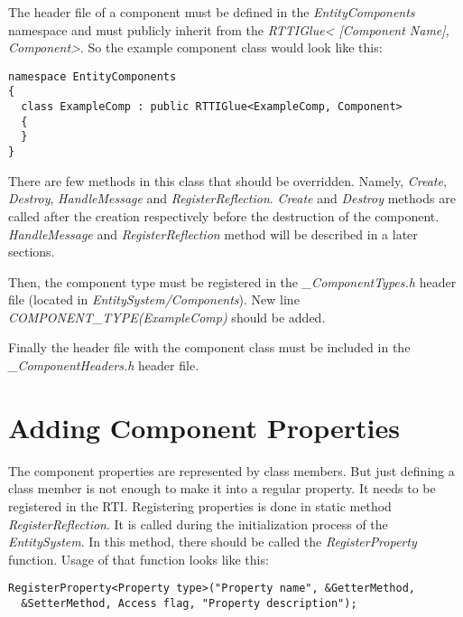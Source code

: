 \documentclass[a4paper, 12pt]{report}
\begin{document}
The header file of a component must be defined in the \emph{EntityComponents} namespace and must publicly inherit from the  \emph{RTTIGlue< [Component Name], Component>}. So the example component class would look like this:

\begin{verbatim}
namespace EntityComponents
{
  class ExampleComp : public RTTIGlue<ExampleComp, Component>
  {
  }
}
\end{verbatim}

There are few methods in this class that should be overridden. Namely, \emph{Create}, \emph{Destroy}, \emph{HandleMessage} and \emph{RegisterReflection}. \emph{Create} and \emph{Destroy} methods are called after the creation respectively before the destruction of the component. \emph{HandleMessage} and \emph{RegisterReflection} method will be described in a later sections.

Then, the component type must be registered in the \emph{\_ComponentTypes.h} header file (located in \emph{EntitySystem/Components}). New line \emph{COMPONENT\_TYPE(ExampleComp)} should be added.

Finally the header file with the component class must be included in the \emph{\_ComponentHeaders.h} header file.

\section{Adding Component Properties}

The component properties are represented by class members. But just defining a class member is not enough to make it into a regular property. It needs to be registered in the RTI. Registering properties is done in static method \emph{RegisterReflection}. It is called during the initialization process of the \emph{EntitySystem}. In this method, there should be called the \emph{RegisterProperty} function. Usage of that function looks like this:

\begin{verbatim}
RegisterProperty<Property type>("Property name", &GetterMethod, 
  &SetterMethod, Access flag, "Property description");
\end{verbatim}
\end{document}
